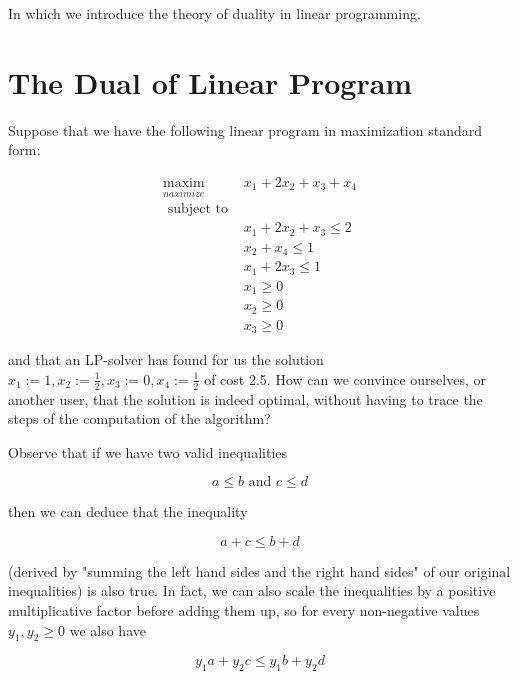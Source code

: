 




In which we introduce the theory of duality in linear programming.

\section{The Dual of Linear Program}

Suppose that we have the following linear program in maximization standard form:

$$
\begin{array}{ll}
\underset{n a x i m i z e}{\operatorname{maxim}} & x_{1}+2 x_{2}+x_{3}+x_{4} \\
\text { subject to } & \\
& x_{1}+2 x_{2}+x_{3} \leq 2 \\
& x_{2}+x_{4} \leq 1 \\
& x_{1}+2 x_{3} \leq 1 \\
& x_{1} \geq 0 \\
& x_{2} \geq 0 \\
& x_{3} \geq 0
\end{array}
$$

and that an LP-solver has found for us the solution $x_{1}:=1, x_{2}:=\frac{1}{2}, x_{3}:=0, x_{4}:=\frac{1}{2}$ of cost 2.5. How can we convince ourselves, or another user, that the solution is indeed optimal, without having to trace the steps of the computation of the algorithm?

Observe that if we have two valid inequalities

$$
a \leq b \text { and } c \leq d
$$

then we can deduce that the inequality

$$
a+c \leq b+d
$$

(derived by "summing the left hand sides and the right hand sides" of our original inequalities) is also true. In fact, we can also scale the inequalities by a positive multiplicative factor before adding them up, so for every non-negative values $y_{1}, y_{2} \geq 0$ we also have 

$$
y_{1} a+y_{2} c \leq y_{1} b+y_{2} d
$$

